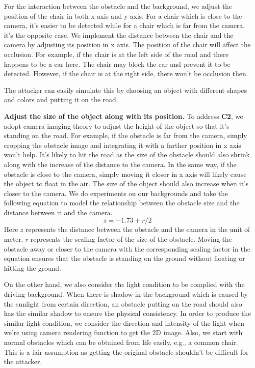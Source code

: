 For the interaction between the obstacle and the background, we adjust the position of the chair in both x axis and y axis.
For a chair which is close to the camera, it's easier to be detected while for a chair which is far from the camera, it's the opposite case.
We implement the distance between the chair and the camera by adjusting its position in x axis.
The position of the chair will affect the occlusion. 
For example, if the chair is at the left side of the road and there happens to be a car here. 
The chair may block the car and prevent it to be detected.
However, if the chair is at the right side, there won't be occlusion then.

The attacker can easily simulate this by choosing an object with different shapes and colors and putting it on the road.

\textbf{Adjust the size of the object along with its position.}
To address \textbf{C2}, we adopt camera imaging theory to adjust the height of the object so that it's standing on the road.
For example, if the obstacle is far from the camera, simply cropping the obstacle image and integrating it with a farther position in x axis won't help.
It's likely to hit the road as the size of the obstacle should also shrink along with the increase of the distance to the camera.
In the same way, if the obstacle is close to the camera, simply moving it closer in x axis will likely cause the object to float in the air.
The size of the object should also increase when it's closer to the camera.
We do experiments on our backgrounds and take the following equation to model the relationship between the obstacle size and the distance between it and the camera.
\begin{equation}
	z = -1.73 + r/2
\end{equation}
Here \(z\) represents the distance between the obstacle and the camera in the unit of meter. \(r\) represents the scaling factor of the size of the obstacle.
Moving the obstacle away or closer to the camera with the corresponding scaling factor in the equation ensures 
that the obstacle is standing on the ground without floating or hitting the ground.

On the other hand, we also consider the light condition to be complied with the driving background.
When there is shadow in the background which is caused by the sunlight from certain direction, 
an obstacle putting on the road should also has the similar shadow to ensure the physical consistency.
In order to produce the similar light condition, 
we consider the direction and intensity of the light when we're using camera rendering function to get the 2D image.
Also, we start with normal obstacles which can be obtained from
life easily, e.g., a common chair.
This is a fair assumption as getting the original obstacle shouldn't be difficult for the attacker.

